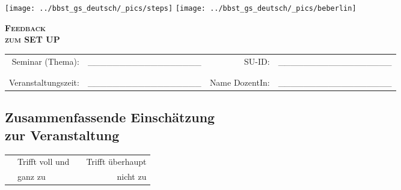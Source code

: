 \documentclass[a4paper]{article}
\begin{document}
\vspace{-0.5cm}

\texttt{[image: ../bbst\_gs\_deutsch/\_pics/steps]} \hspace{4.9cm}
\texttt{[image: ../bbst\_gs\_deutsch/\_pics/beberlin]}

\vspace{.5cm}

\begin{center}
	\textbf{\Huge \scshape Feedback} \\ \vspace{0.3cm}
	\textbf{\huge \scshape zum SET UP}
\end{center}

\vspace{.9cm}

\begin{tabular}{rlrl}
Seminar (Thema): & \_\_\_\_\_\_\_\_\_\_\_\_\_\_\_\_\_\_ &
SU-ID: 					 & \_\_\_\_\_\_\_\_\_\_\_\_\_\_\_\_\_\_ \\
 & \\
 & \\
Veranstaltungszeit: & \_\_\_\_\_\_\_\_\_\_\_\_\_\_\_\_\_\_ &
Name DozentIn: 			& \_\_\_\_\_\_\_\_\_\_\_\_\_\_\_\_\_\_
\end{tabular}

\vspace{.5cm}

\subsection*{Zusammenfassende Einschätzung \\ zur Veranstaltung}

\vspace{-1.3cm}

\begin{tabular}{p{7cm} l p{1cm} r}
	& Trifft voll und & & Trifft überhaupt \\
	& ganz zu 				& & nicht zu
\end{tabular}

\vspace{-.1cm}


 \\
\end{document}
